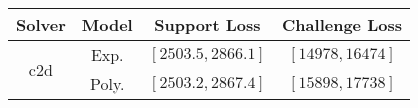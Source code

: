 \begin{tabular}{cc|c|c} 
\hline 
 Solver & Model & Support Loss  & Challenge Loss \tabularnewline\hline 
\hline 
\multirow{2}{*}{c2d} & Exp. & $\left[2503.5,2866.1\right]$ & $\left[14978,16474\right]$ \tabularnewline 
 & Poly. & $\left[2503.2,2867.4\right]$ & $\left[15898,17738\right]$ \tabularnewline 
\hline 
\end{tabular} 


